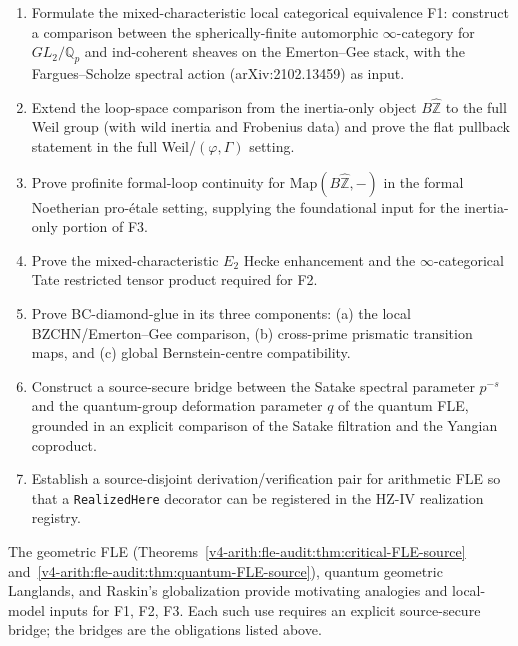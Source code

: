 \begin{enumerate}
\item Formulate the mixed-characteristic local categorical
equivalence F1: construct a comparison between the spherically-finite
automorphic \(\infty\)-category for \(GL_{2}/\mathbb{Q}_{p}\) and
ind-coherent sheaves on the Emerton--Gee stack, with the
Fargues--Scholze spectral action (arXiv:2102.13459) as input.
\item Extend the loop-space comparison from the inertia-only object
\(B\widehat{\mathbb{Z}}\) to the full Weil group (with wild inertia
and Frobenius data) and prove the flat pullback statement in the full
Weil/\((\varphi,\Gamma)\) setting.
\item Prove profinite formal-loop continuity for
\(\mathrm{Map}(B\widehat{\mathbb{Z}}, -)\) in the formal Noetherian
pro-\'etale setting, supplying the foundational input for the
inertia-only portion of F3.
\item Prove the mixed-characteristic \(E_{2}\) Hecke enhancement and
the \(\infty\)-categorical Tate restricted tensor product required for
F2.
\item Prove BC-diamond-glue in its three components: (a) the local
BZCHN/Emerton--Gee comparison, (b) cross-prime prismatic transition
maps, and (c) global Bernstein-centre compatibility.
\item Construct a source-secure bridge between the Satake spectral
parameter \(p^{-s}\) and the quantum-group deformation parameter
\(q\) of the quantum FLE, grounded in an explicit comparison of the
Satake filtration and the Yangian coproduct.
\item Establish a source-disjoint derivation/verification pair for
arithmetic FLE so that a \texttt{RealizedHere} decorator can be
registered in the HZ-IV realization registry.
\end{enumerate}

\begin{remark}
\label{v4-arith:fle-audit:rem:integration-rule}
The geometric FLE (Theorems~\ref{v4-arith:fle-audit:thm:critical-FLE-source}
and~\ref{v4-arith:fle-audit:thm:quantum-FLE-source}), quantum
geometric Langlands, and Raskin's globalization provide motivating
analogies and local-model inputs for F1, F2, F3. Each such use
requires an explicit source-secure bridge; the bridges are the
obligations listed above.
\end{remark}
